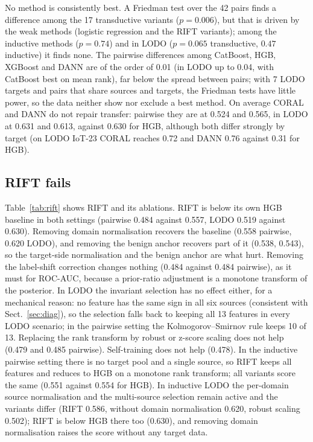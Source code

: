 \documentclass[11pt]{article}
\begin{document}
No method is consistently best.
A Friedman test over the 42 pairs finds a difference among the 17 transductive variants ($p=0.006$), but that is driven by the weak methods (logistic regression and the RIFT variants); among the inductive methods ($p=0.74$) and in LODO ($p=0.065$ transductive, $0.47$ inductive) it finds none.
The pairwise differences among CatBoost, HGB, XGBoost and DANN are of the order of 0.01 (in LODO up to 0.04, with CatBoost best on mean rank), far below the spread between pairs; with 7 LODO targets and pairs that share sources and targets, the Friedman tests have little power, so the data neither show nor exclude a best method.
On average CORAL and DANN do not repair transfer: pairwise they are at 0.524 and 0.565, in LODO at 0.631 and 0.613, against 0.630 for HGB, although both differ strongly by target (on LODO IoT-23 CORAL reaches 0.72 and DANN 0.76 against 0.31 for HGB).

\subsection{RIFT fails}
Table~\ref{tab:rift} shows RIFT and its ablations.
RIFT is below its own HGB baseline in both settings (pairwise 0.484 against 0.557, LODO 0.519 against 0.630).
Removing domain normalisation recovers the baseline (0.558 pairwise, 0.620 LODO), and removing the benign anchor recovers part of it (0.538, 0.543), so the target-side normalisation and the benign anchor are what hurt.
Removing the label-shift correction changes nothing (0.484 against 0.484 pairwise), as it must for ROC-AUC, because a prior-ratio adjustment is a monotone transform of the posterior.
In LODO the invariant selection has no effect either, for a mechanical reason: no feature has the same sign in all six sources (consistent with Sect.~\ref{sec:diag}), so the selection falls back to keeping all 13 features in every LODO scenario; in the pairwise setting the Kolmogorov--Smirnov rule keeps 10 of 13.
Replacing the rank transform by robust or z-score scaling does not help (0.479 and 0.485 pairwise).
Self-training does not help (0.478).
In the inductive pairwise setting there is no target pool and a single source, so RIFT keeps all features and reduces to HGB on a monotone rank transform; all variants score the same (0.551 against 0.554 for HGB).
In inductive LODO the per-domain source normalisation and the multi-source selection remain active and the variants differ (RIFT 0.586, without domain normalisation 0.620, robust scaling 0.502); RIFT is below HGB there too (0.630), and removing domain normalisation raises the score without any target data.
\end{document}
